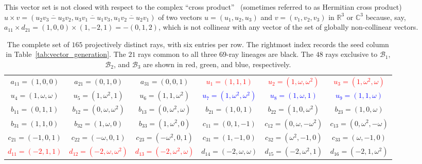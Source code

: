 \documentclass[%
  reprint,
  superscriptaddress,
  showpacs,
  showkeys,
  amsmath,amssymb,
  pra,
  longbibliography,
  floatfix,
  x11names
]{revtex4-2}
\newcommand{\rev}[1]{{\color{revisionblue}#1}}
\begin{document}
This vector set is not closed with respect to the complex ``cross product''~\cite{harding2025remarksIJTP} (sometimes referred to as Hermitian cross product)
\(
u\times v =  (\overline{u_2v_3-u_3v_2},\overline{u_3v_1-u_1v_3},\overline{u_1v_2-u_2v_1})
\)
of two vectors $u=(u_1,u_2,u_3)$ and $v=(v_1,v_2,v_3)$ in $\mathbb{R}^3$ or $\mathbb{C}^3$ because, say,
$a_{11} \times d_{21} = (1,0,0) \times (1,-2,1) = -(0,1,2)$, which is not collinear with any vector of the set of globally non-collinear vectors.



\begin{table}[htbp!]
\caption{
\rev{The complete set of $165$ projectively distinct rays, with six entries per row.  The rightmost index records the seed column in Table~\ref{tab:vector_generation}.  The $21$ rays common to all three 69-ray lineages are black.  The $48$ rays exclusive to $\mathcal{B}_1$, $\mathcal{B}_2$, and $\mathcal{B}_3$ are shown in red, green, and blue, respectively.}
}
\label{tab:noncollinear_vectors_6col}
\footnotesize %
\begin{ruledtabular}
\begin{tabular}{*{6}{c}} %
{$a_{11}=(1,0,0)$} & {$a_{21}=(0,1,0)$} & {$a_{31}=(0,0,1)$} & \textcolor{red}{$u_{1}=(1,1,1)$} & \textcolor{red}{$u_{2}=(1,\omega,\omega^2)$} & \textcolor{red}{$u_{3}=(1,\omega^2,\omega)$} \\
\textcolor{green!40!black}{$u_{4}=(1,\omega,\omega)$} & \textcolor{green!40!black}{$u_{5}=(1,\omega^2,1)$} & \textcolor{green!40!black}{$u_{6}=(1,1,\omega^2)$} & \textcolor{blue}{$u_{7}=(1,\omega^2,\omega^2)$} & \textcolor{blue}{$u_{8}=(1,\omega,1)$} & \textcolor{blue}{$u_{9}=(1,1,\omega)$} \\
{$b_{11}=(0,1,1)$} & {$b_{12}=(0,\omega,\omega^2)$} & {$b_{13}=(0,\omega^2,\omega)$} & {$b_{21}=(1,0,1)$} & {$b_{22}=(1,0,\omega^2)$} & {$b_{23}=(1,0,\omega)$} \\
{$b_{31}=(1,1,0)$} & {$b_{32}=(1,\omega,0)$} & {$b_{33}=(1,\omega^2,0)$} & {$c_{11}=(0,1,-1)$} & {$c_{12}=(0,\omega,-\omega^2)$} & {$c_{13}=(0,\omega^2,-\omega)$} \\
{$c_{21}=(-1,0,1)$} & {$c_{22}=(-\omega,0,1)$} & {$c_{23}=(-\omega^2,0,1)$} & {$c_{31}=(1,-1,0)$} & {$c_{32}=(\omega^2,-1,0)$} & {$c_{33}=(\omega,-1,0)$} \\
\textcolor{red}{$d_{11}=(-2,1,1)$} & \textcolor{red}{$d_{12}=(-2,\omega,\omega^2)$} & \textcolor{red}{$d_{13}=(-2,\omega^2,\omega)$} & \textcolor{green!40!black}{$d_{14}=(-2,\omega,\omega)$} & \textcolor{green!40!black}{$d_{15}=(-2,\omega^2,1)$} & \textcolor{green!40!black}{$d_{16}=(-2,1,\omega^2)$} \\

\end{tabular}
\end{ruledtabular}
\end{table}
\end{document}

